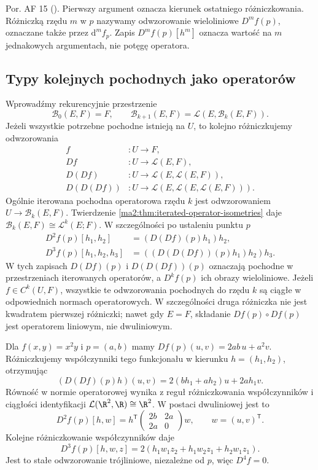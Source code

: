 Por. AF 15 (). Pierwszy argument
oznacza kierunek ostatniego różniczkowania.
Różniczką rzędu $m$ w $p$ nazywamy odwzorowanie
wieloliniowe $D^mf(p)$, oznaczane także przez
$\mathrm d^mf_p$. Zapis $D^mf(p)[h^m]$ oznacza
wartość na $m$ jednakowych argumentach, nie potęgę operatora.

\subsection{Typy kolejnych pochodnych jako operatorów}

Wprowadźmy rekurencyjnie przestrzenie
\[
 \mathcal B_0(E,F)=F,\qquad
 \mathcal B_{k+1}(E,F)=\mathcal L(E,\mathcal B_k(E,F)).
\]
Jeżeli wszystkie potrzebne pochodne istnieją na $U$,
to kolejno różniczkujemy odwzorowania
\[
 \begin{aligned}
 f&:U\longrightarrow F,\\
 Df&:U\longrightarrow\mathcal L(E,F),\\
 D(Df)&:U\longrightarrow\mathcal L(E,\mathcal L(E,F)),\\
 D(D(Df))&:U\longrightarrow
     \mathcal L(E,\mathcal L(E,\mathcal L(E,F))).
 \end{aligned}
\]
Ogólnie iterowana pochodna operatorowa rzędu $k$
jest odwzorowaniem $U\to\mathcal B_k(E,F)$.
Twierdzenie \ref{ma2:thm:iterated-operator-isometries}
daje $\mathcal B_k(E,F)\cong\mathcal L^k(E;F)$.
W szczególności po ustaleniu punktu $p$
\[
 \begin{aligned}
 D^2f(p)[h_1,h_2]&=(D(Df)(p)h_1)h_2,\\
 D^3f(p)[h_1,h_2,h_3]&=((D(D(Df))(p)h_1)h_2)h_3.
 \end{aligned}
\]
W tych zapisach $D(Df)(p)$ i $D(D(Df))(p)$
oznaczają pochodne w przestrzeniach iterowanych
operatorów, a $D^kf(p)$ ich obrazy wieloliniowe.
Jeżeli $f\in C^k(U,F)$, wszystkie te odwzorowania
pochodnych do rzędu $k$ są ciągłe w odpowiednich
normach operatorowych. W szczególności druga
różniczka nie jest kwadratem pierwszej różniczki;
nawet gdy $E=F$, składanie $Df(p)\circ Df(p)$
jest operatorem liniowym, nie dwuliniowym.

\begin{przyklad}
\label{ma2:ex:iterated-operator-hessian}
Dla $f(x,y)=x^2y$ i $p=(a,b)$ mamy
$Df(p)(u,v)=2ab\,u+a^2v$.
Różniczkujemy współczynniki tego funkcjonału
w kierunku $h=(h_1,h_2)$, otrzymując
\[
 (D(Df)(p)h)(u,v)
 =2(bh_1+ah_2)u+2ah_1v.
\]
Równość w normie operatorowej wynika z reguł
różniczkowania współczynników i ciągłości
identyfikacji $\mathcal L(\R^2,\R)\cong\R^2$.
W postaci dwuliniowej jest to
\[
 D^2f(p)[h,w]=h^{\mathsf T}
 \begin{pmatrix}2b&2a\\2a&0\end{pmatrix}w,
 \qquad w=(u,v)^{\mathsf T}.
\]
Kolejne różniczkowanie współczynników daje
\[
 D^3f(p)[h,w,z]=2(h_1w_1z_2+h_1w_2z_1+h_2w_1z_1).
\]
Jest to stałe odwzorowanie trójliniowe,
niezależne od $p$, więc $D^4f=0$.
\end{przyklad}

